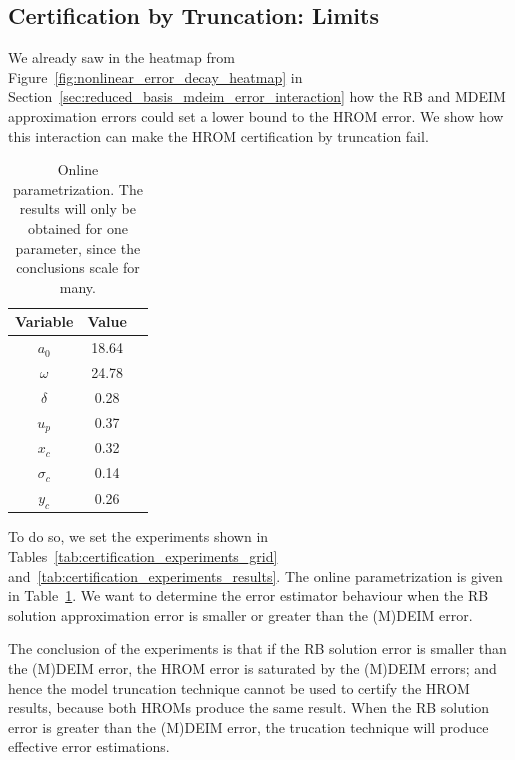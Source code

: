 \documentclass[../../thesis.tex]{subfiles}
\begin{document}
\subsection{Certification by Truncation: Limits}
\label{sec:certification_limits}
We already saw in the heatmap from Figure~\ref{fig:nonlinear_error_decay_heatmap}
in Section~\ref{sec:reduced_basis_mdeim_error_interaction}
how the RB and MDEIM approximation errors could 
set a lower bound to the HROM error.
We show how this interaction can make 
the HROM certification by truncation fail.
\begin{table}[h]
    \centering
    \caption{Online parametrization.
    The results will only be obtained for one parameter,
    since the conclusions scale for many.}
    \begin{tabular}{ccc}
    \toprule
        Variable   & Value  \\ 
        \midrule
        $a_0$      & 18.64   \\
        $\omega$   & 24.78   \\
        $\delta$   & 0.28    \\
        $u_p$      & 0.37    \\
        \midrule
        $x_c$      & 0.32    \\
        $\sigma_c$ & 0.14    \\
        $y_c$      & 0.26    \\ 
        \bottomrule
    \end{tabular}
    \label{tab:parameters_online_arbitrary}
\end{table}
To do so, we set the experiments shown in 
Tables~\ref{tab:certification_experiments_grid} 
and~\ref{tab:certification_experiments_results}.
The online parametrization is given in Table~\ref{tab:parameters_online_arbitrary}.
We want to determine the error estimator behaviour when 
the RB solution approximation error is smaller or greater than the (M)DEIM error.

The conclusion of the experiments is that if the RB solution error 
is smaller than the (M)DEIM error,
the HROM error is saturated by the (M)DEIM errors;
and hence the model truncation technique cannot be used to certify the HROM results,
because both HROMs produce the same result.
When the RB solution error is greater than the (M)DEIM error, 
the trucation technique will produce effective error estimations.
\end{document}
